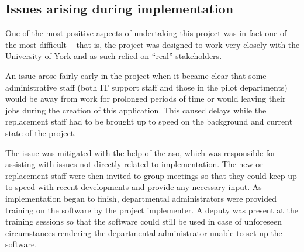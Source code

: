 \documentclass[draft]{scrartcl}
\begin{document}
\subsection{Issues arising during implementation}



One of the most positive aspects of undertaking this project was in fact one
of the most difficult -- that is, the project was designed to work very
closely with the University of York and as such relied on ``real''
stakeholders.

An issue arose fairly early in the project when it became clear that some
administrative staff (both IT support staff and those in the pilot
departments) would be away from work for prolonged periods of time or would
leaving their jobs during the creation of this application. This caused delays
while the replacement staff had to be brought up to speed on the background
and current state of the project.

The issue was mitigated with the help of the \gls{aso}, which was responsible
for assisting with issues not directly related to implementation. The new or
replacement staff were then invited to group meetings so that they could keep
up to speed with recent developments and provide any necessary input. As
implementation began to finish, departmental administrators were provided
training on the software by the project implementer. A deputy was present at
the training sessions so that the software could still be used in case of
unforeseen circumstances rendering the departmental administrator unable to
set up the software.






\end{document}
